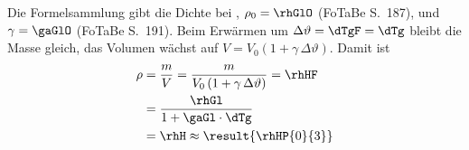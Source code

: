 Die Formelsammlung gibt die Dichte bei \TAgO, $\rho_0 = \rhGlO$ (FoTaBe S.~187), und $\gamma = \gaGlO$ (FoTaBe S.~191). Beim Erwärmen um $\Delta\vartheta = \dTgF = \dTg$ bleibt die Masse gleich, das Volumen wächst auf $V = V_0\left(1+\gamma\,\Delta\vartheta\right)$. Damit ist
\begin{align}
 \rho &= \frac{m}{V} = \frac{m}{V_0\left(1+\gamma\,\Delta\vartheta\right)} = \rhHF \\
   &= \frac{\rhGl}{1+\gaGl\cdot\dTg} \\
   &= \rhH \approx \result{\rhHP{0}{3}}
\end{align}

